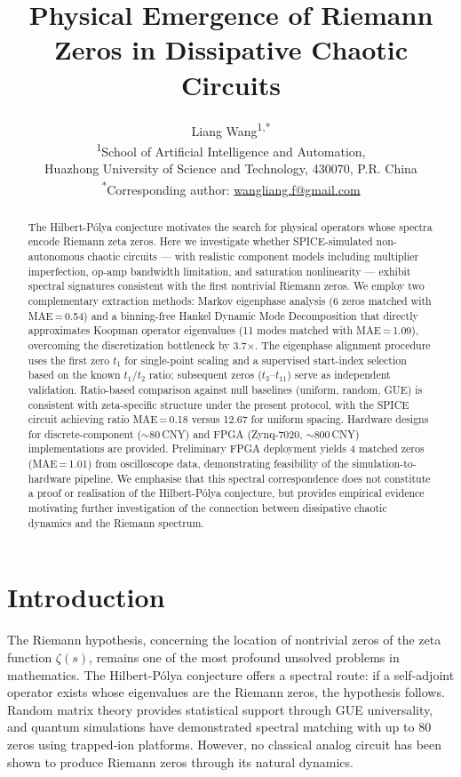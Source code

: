 \documentclass[11pt]{article}
\title{\LARGE \textbf{Physical Emergence of Riemann Zeros in Dissipative Chaotic Circuits}}
\author{
Liang Wang\textsuperscript{1,*}
\\[6pt]
\textsuperscript{1}School of Artificial Intelligence and Automation, \\
Huazhong University of Science and Technology, 430070, P.R. China \\[4pt]
\textsuperscript{*}Corresponding author: \href{mailto:wangliang.f@gmail.com}{wangliang.f@gmail.com}
}
\date{}
\begin{document}
\maketitle

\begin{abstract}
\noindent
The Hilbert-P\'olya conjecture motivates the search for physical operators whose spectra encode Riemann zeta zeros. Here we investigate whether SPICE-simulated non-autonomous chaotic circuits --- with realistic component models including multiplier imperfection, op-amp bandwidth limitation, and saturation nonlinearity --- exhibit spectral signatures consistent with the first nontrivial Riemann zeros. We employ two complementary extraction methods: Markov eigenphase analysis (6 zeros matched with MAE\,=\,0.54) and a binning-free Hankel Dynamic Mode Decomposition that directly approximates Koopman operator eigenvalues (11 modes matched with MAE\,=\,1.09), overcoming the discretization bottleneck by 3.7$\times$. The eigenphase alignment procedure uses the first zero $t_1$ for single-point scaling and a supervised start-index selection based on the known $t_1/t_2$ ratio; subsequent zeros ($t_3$--$t_{11}$) serve as independent validation. Ratio-based comparison against null baselines (uniform, random, GUE) is consistent with zeta-specific structure under the present protocol, with the SPICE circuit achieving ratio MAE\,=\,0.18 versus 12.67 for uniform spacing. Hardware designs for discrete-component (${\sim}$80\,CNY) and FPGA (Zynq-7020, ${\sim}$800\,CNY) implementations are provided. Preliminary FPGA deployment yields 4 matched zeros (MAE\,=\,1.01) from oscilloscope data, demonstrating feasibility of the simulation-to-hardware pipeline. We emphasise that this spectral correspondence does not constitute a proof or realisation of the Hilbert-P\'olya conjecture, but provides empirical evidence motivating further investigation of the connection between dissipative chaotic dynamics and the Riemann spectrum.
\end{abstract}

\section*{Introduction}

The Riemann hypothesis, concerning the location of nontrivial zeros of the zeta function $\zeta(s)$, remains one of the most profound unsolved problems in mathematics. The Hilbert-P\'olya conjecture offers a spectral route: if a self-adjoint operator exists whose eigenvalues are the Riemann zeros, the hypothesis follows\cite{berry1999}. Random matrix theory provides statistical support through GUE universality\cite{montgomery1973}, and quantum simulations have demonstrated spectral matching with up to 80 zeros using trapped-ion platforms\cite{cui2021}. However, no classical analog circuit has been shown to produce Riemann zeros through its natural dynamics.
\end{document}
